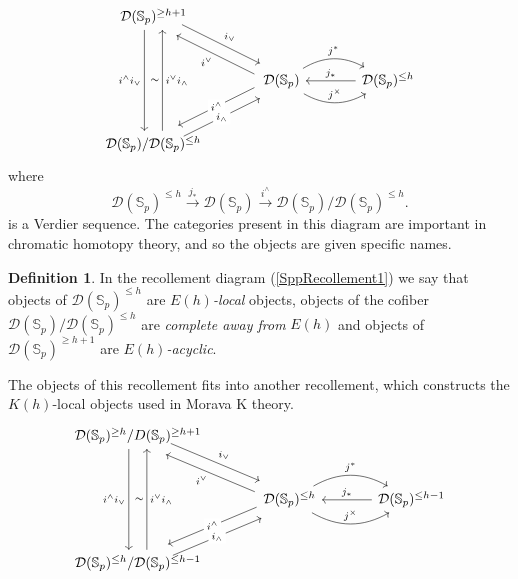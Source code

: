 \documentclass[a4paper]{article} %
\theoremstyle{definition}
\newtheorem{definition}[theorem]{Definition}
\newcommand{\toWithMapLong}[1]{\overset{#1}{\longrightarrow}}
\newcommand{\Spp}{\mathcal{D}(\mathbb{S}_p)}
\begin{document}
\begin{equation}
  \label{SppRecollement1}
  \begin{tikzcd}[sep = large]
  \Spp^{\ge h+1} \arrow[dr, shift left=1ex, "i_\vee"] \arrow[dd, shift right=1.5ex, "i^\wedge i_\vee"'] \\
  {} & \Spp  \arrow[dl,shift  right=1ex, "i^\wedge" description]  \arrow[ul, shift left=1ex, "i^\vee"]  \arrow[r, bend left, "j^*"] \arrow[r, above, bend right, "j^\times"] & \arrow{l}{}[swap]{j_*} \Spp^{\le h} \\
  \Spp/ \Spp^{\le h} \arrow[ur, shift right=1ex, "i_\wedge" description] \arrow[uu, shift right=1.5ex, "\sim", "i^\vee i_\wedge"']
  \end{tikzcd}
\end{equation}
where
\[
\Spp^{\le h} \toWithMapLong{j_*} \Spp \toWithMapLong{i^\wedge} \Spp / \Spp^{\le h}.
\]
is a Verdier sequence. The categories present in this diagram are important in chromatic homotopy theory, and so the objects are given specific names.
\begin{definition}
In the recollement diagram (\ref{SppRecollement1}) we say that objects of $\Spp^{\le h}$ are $E(h)$\textit{-local} objects, objects of the cofiber $\Spp/\Spp^{\le h}$ are \textit{complete away from} $E(h)$ and objects of $\Spp^{\ge h+1}$ are $E(h)$\textit{-acyclic}.
\end{definition}
The objects of this recollement fits into another recollement, which constructs the $K(h)$-local objects used in Morava K theory.
\begin{equation}
  \label{SppRecollement2}
    \begin{tikzcd}[sep = large]
    \Spp^{\ge h}/D(\mathbb{S}_p)^{\ge h+1} \arrow[dr, shift left=1ex, "i_\vee"] \arrow[dd, shift right=1.5ex, "i^\wedge i_\vee"'] \\
    {} & \Spp^{\le h}  \arrow[dl,shift  right=1ex, "i^\wedge" description]  \arrow[ul, shift left=1ex, "i^\vee"]  \arrow[r, bend left, "j^*"] \arrow[r, above, bend right, "j^\times"] & \arrow{l}{}[swap]{j_*} \Spp^{\le h-1} \\
    \Spp^{\le h}/\Spp^{\le h-1} \arrow[ur, shift right=1ex, "i_\wedge" description] \arrow[uu, shift right=1.5ex, "\sim", "i^\vee i_\wedge"']
    \end{tikzcd}
\end{equation}
\end{document}
